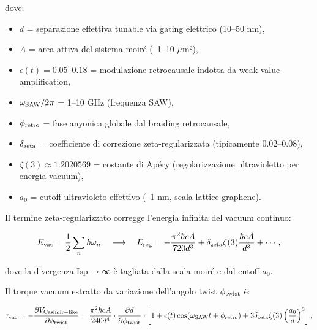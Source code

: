 \documentclass[11pt,a4paper]{article}
\theoremstyle{plain}
\theoremstyle{definition}
\begin{document}
dove:
\begin{itemize}
    \item $d$ = separazione effettiva tunable via gating elettrico (10–50 nm),
    \item $A$ = area attiva del sistema moiré (~1–10 $\mu$m²),
    \item $\epsilon(t) = 0.05–0.18$ = modulazione retrocausale indotta da weak value amplification,
    \item $\omega_{\rm SAW}/2\pi$ = 1–10 GHz (frequenza SAW),
    \item $\phi_{\rm retro}$ = fase anyonica globale dal braiding retrocausale,
    \item $\delta_{\rm zeta}$ = coefficiente di correzione zeta-regularizzata (tipicamente 0.02–0.08),
    \item $\zeta(3) \approx 1.2020569$ = costante di Apéry (regolarizzazione ultravioletto per energia vacuum),
    \item $a_0$ = cutoff ultravioleto effettivo (~1 nm, scala lattice graphene).
\end{itemize}

Il termine zeta-regularizzato corregge l'energia infinita del vacuum continuo:

\begin{equation}
E_{\rm vac} = \frac{1}{2} \sum_n \hbar \omega_n \quad \longrightarrow \quad E_{\rm reg} = -\frac{\pi^2 \hbar c A}{720 d^3} + \delta_{\rm zeta} \zeta(3) \frac{\hbar c A}{d^3} + \cdots,
\label{eq:zeta_regularized_energy}
\end{equation}

\vspace{0.3cm}

dove la divergenza Isp → ∞ è tagliata dalla scala moiré e dal cutoff $a_0$.

\vspace{0.2cm}

Il torque vacuum estratto da variazione dell'angolo twist $\phi_{\rm twist}$ è:

\begin{equation}
\tau_{\rm vac} = -\frac{\partial V_{\rm Casimir-like}}{\partial \phi_{\rm twist}} = \frac{\pi^2 \hbar c A}{240 d^4} \cdot \frac{\partial d}{\partial \phi_{\rm twist}} \cdot \left[ 1 + \epsilon(t) \cos(\omega_{\rm SAW} t + \phi_{\rm retro}) + 3\delta_{\rm zeta} \zeta(3) \left( \frac{a_0}{d} \right)^3 \right],
\label{eq:vacuum_torque_full}
\end{equation}


\vspace{0.2cm}
\end{document}

